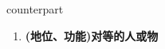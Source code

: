 
\begin{frame}
{\huge counterpart}
\begin{center}
\begin{enumerate}\Large
  \item \textbf{(地位、功能)对等的人或物}
\end{enumerate}
\end{center}
\end{frame}
